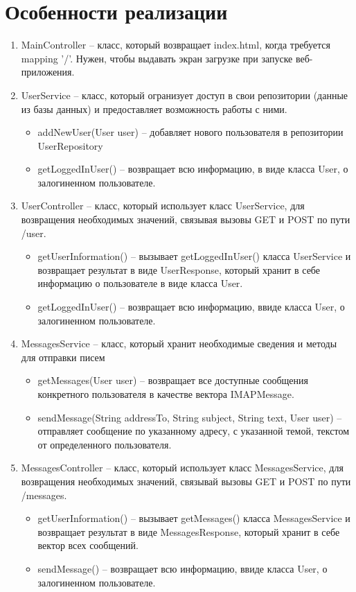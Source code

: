 \documentclass{article}
\begin{document}
\section{Особенности реализации}
\begin{enumerate}
\item MainController -- класс, который возвращает index.html, когда требуется mapping '/'. Нужен, чтобы выдавать экран загрузке при запуске веб-приложения.

\item UserService -- класс, который огранизует доступ в свои репозитории (данные из базы данных) и предоставляет возможность работы с ними.
	\begin{itemize}
	\item addNewUser(User user) -- добавляет нового пользователя в репозитории UserRepository
	\item getLoggedInUser() -- возвращает всю информацию, в виде класса User, о залогиненном пользователе.
	\end{itemize}
	
\item UserController -- класс, который использует класс UserService, для возвращения необходимых значений, связывая вызовы GET и POST по пути /user.
	\begin{itemize}
	\item getUserInformation() -- вызывает getLoggedInUser() класса UserService и возвращает результат в виде UserResponse, который хранит в себе информацию о пользователе в виде класса User.
	\item getLoggedInUser() -- возвращает всю информацию, ввиде класса User, о залогиненном пользователе.
	\end{itemize}
	
\item MessagesService -- класс, который хранит необходимые сведения и методы для отправки писем
	\begin{itemize}
	\item getMessages(User user) -- возвращает все доступные сообщения конкретного пользователя в качестве вектора IMAPMessage.
	\item sendMessage(String addressTo, String subject, String text, User user) -- отправляет сообщение по указанному адресу, с указанной темой, текстом от определенного пользователя.
	\end{itemize}
	
\item MessagesController -- класс, который использует класс MessagesService, для возвращения необходимых значений, связывай вызовы GET и POST по пути /messages.
	\begin{itemize}
	\item getUserInformation() -- вызывает getMessages() класса MessagesService и возвращает результат в виде MessagesResponse, который хранит в себе вектор всех сообщений.
	\item sendMessage() -- возвращает всю информацию, ввиде класса User, о залогиненном пользователе.
	\end{itemize}
	
\end{enumerate}
\end{document}
